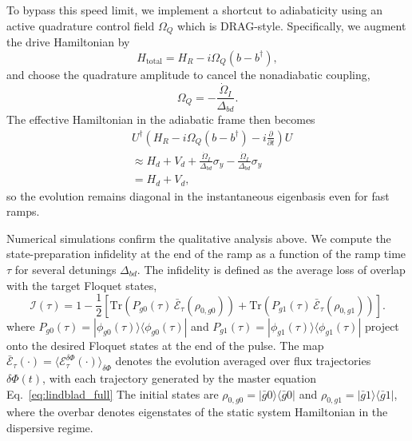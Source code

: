 To bypass this speed limit, we implement a shortcut to adiabaticity using an active quadrature control field $\Omega_Q$ which is DRAG-style.
Specifically, we augment the drive Hamiltonian by
\begin{equation}
H_{\text{total}} = H_R - i \Omega_Q (b - b^\dagger),
\end{equation}
and choose the quadrature amplitude to cancel the nonadiabatic coupling,
\begin{equation}
\Omega_Q = -\frac{\dot{\Omega}_I}{\Delta_{bd}}.
\end{equation}
The effective Hamiltonian in the adiabatic frame then becomes
\begin{equation}
\begin{aligned}
&U^\dagger \left( H_R - i \Omega_Q (b - b^\dagger) - i \frac{\partial}{\partial t} \right) U\\
&\approx H_d + V_d + \frac{\dot{\Omega}_I}{\Delta_{bd}} \sigma_y - \frac{\dot{\Omega}_I}{\Delta_{bd}} \sigma_y \\
&= H_d + V_d,
\end{aligned}
\end{equation}
so the evolution remains diagonal in the instantaneous eigenbasis even for fast ramps.

Numerical simulations confirm the qualitative analysis above. We compute the state-preparation infidelity at the end of the ramp as a function of the ramp time $\tau$ for several detunings $\Delta_{bd}$.
The infidelity is defined as the average loss of overlap with the target Floquet states,
\begin{equation}
\label{eq:infidelity_def}
\mathcal{I}(\tau)
=
1-\frac{1}{2}\left[
\mathrm{Tr}\!\left(P_{g0}(\tau)\,\bar{\mathcal{E}}_{\tau}\!\left(\rho_{0,g0}\right)\right)
+
\mathrm{Tr}\!\left(P_{g1}(\tau)\,\bar{\mathcal{E}}_{\tau}\!\left(\rho_{0,g1}\right)\right)
\right].
\end{equation}
where $P_{g0}(\tau)=|\phi_{g0}(\tau)\rangle\langle\phi_{g0}(\tau)|$ and
$P_{g1}(\tau)=|\phi_{g1}(\tau)\rangle\langle\phi_{g1}(\tau)|$ project onto the desired Floquet states at the end of the pulse. The map
$\bar{\mathcal{E}}_{\tau}(\cdot)=\langle \mathcal{E}_{\tau}^{\delta\Phi}(\cdot)\rangle_{\delta\Phi}$
denotes the evolution averaged over flux trajectories $\delta\Phi(t)$, with each trajectory generated by the master equation Eq.\ \eqref{eq:lindblad_full}
The initial states are
$\rho_{0,g0}=|\bar g0\rangle\langle\bar g0|$ and
$\rho_{0,g1}=|\bar g1\rangle\langle\bar g1|$, where the overbar denotes eigenstates of the static system Hamiltonian in the dispersive regime.

